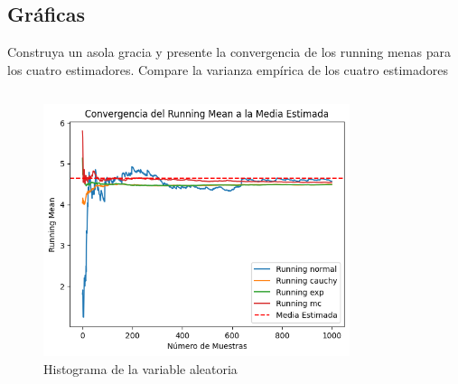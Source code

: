 \documentclass{article}
\begin{document}
\subsection{Gráficas}
Construya un asola gracia y presente la convergencia de los running menas para los cuatro estimadores. Compare la varianza empírica de los
cuatro estimadores

\begin{pythonbox}
	\inputminted{python}{code/all_graphs.py}
\end{pythonbox}


\begin{figure}[H]
	\centering
	\includegraphics[width=0.8\textwidth]{assets/graph.png}
	\caption{Histograma de la variable aleatoria}
\end{figure}
\end{document}
